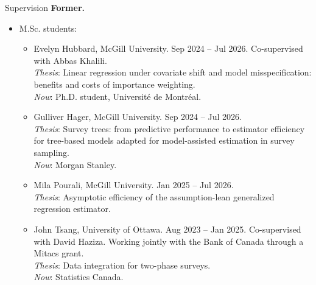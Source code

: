 \documentclass{resume}
\begin{document}
\begin{rSection}{Supervision}
\textbf{Former.}
\begin{itemize}
\item M.Sc. students:
\begin{itemize}
  \item[--] Evelyn Hubbard, McGill University. Sep 2024 -- Jul 2026. Co-supervised with Abbas Khalili. \\
  \emph{Thesis}: Linear regression under covariate shift and model misspecification: benefits and costs of importance weighting. \\
  \emph{Now}: Ph.D. student, Université de Montréal.
  \item[--] Gulliver Hager, McGill University. Sep 2024 -- Jul 2026. \\
  \emph{Thesis}: Survey trees: from predictive performance to estimator efficiency for tree-based models adapted for model-assisted estimation in survey sampling. \\
  \emph{Now}: Morgan Stanley.
  \item[--] Mila Pourali, McGill University. Jan 2025 -- Jul 2026. \\
  \emph{Thesis}: Asymptotic efficiency of the assumption-lean generalized regression estimator.
  \item[--] John Tsang, University of Ottawa. Aug 2023 -- Jan 2025. Co-supervised with David Haziza. Working jointly with the Bank of Canada through a Mitacs grant. \\
  \emph{Thesis}: Data integration for two-phase surveys. \\
  \emph{Now}: Statistics Canada.
\end{itemize}


\end{itemize}
\end{rSection}
\end{document}
